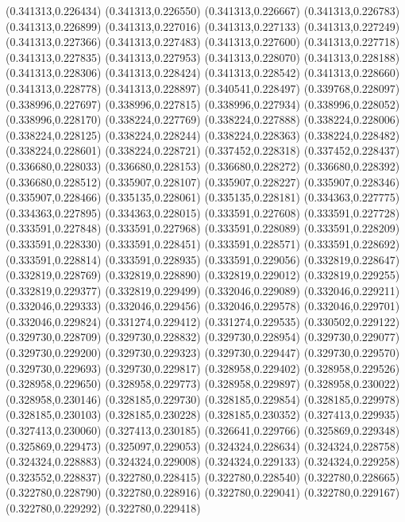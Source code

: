 (0.341313,0.226434)
(0.341313,0.226550)
(0.341313,0.226667)
(0.341313,0.226783)
(0.341313,0.226899)
(0.341313,0.227016)
(0.341313,0.227133)
(0.341313,0.227249)
(0.341313,0.227366)
(0.341313,0.227483)
(0.341313,0.227600)
(0.341313,0.227718)
(0.341313,0.227835)
(0.341313,0.227953)
(0.341313,0.228070)
(0.341313,0.228188)
(0.341313,0.228306)
(0.341313,0.228424)
(0.341313,0.228542)
(0.341313,0.228660)
(0.341313,0.228778)
(0.341313,0.228897)
(0.340541,0.228497)
(0.339768,0.228097)
(0.338996,0.227697)
(0.338996,0.227815)
(0.338996,0.227934)
(0.338996,0.228052)
(0.338996,0.228170)
(0.338224,0.227769)
(0.338224,0.227888)
(0.338224,0.228006)
(0.338224,0.228125)
(0.338224,0.228244)
(0.338224,0.228363)
(0.338224,0.228482)
(0.338224,0.228601)
(0.338224,0.228721)
(0.337452,0.228318)
(0.337452,0.228437)
(0.336680,0.228033)
(0.336680,0.228153)
(0.336680,0.228272)
(0.336680,0.228392)
(0.336680,0.228512)
(0.335907,0.228107)
(0.335907,0.228227)
(0.335907,0.228346)
(0.335907,0.228466)
(0.335135,0.228061)
(0.335135,0.228181)
(0.334363,0.227775)
(0.334363,0.227895)
(0.334363,0.228015)
(0.333591,0.227608)
(0.333591,0.227728)
(0.333591,0.227848)
(0.333591,0.227968)
(0.333591,0.228089)
(0.333591,0.228209)
(0.333591,0.228330)
(0.333591,0.228451)
(0.333591,0.228571)
(0.333591,0.228692)
(0.333591,0.228814)
(0.333591,0.228935)
(0.333591,0.229056)
(0.332819,0.228647)
(0.332819,0.228769)
(0.332819,0.228890)
(0.332819,0.229012)
(0.332819,0.229255)
(0.332819,0.229377)
(0.332819,0.229499)
(0.332046,0.229089)
(0.332046,0.229211)
(0.332046,0.229333)
(0.332046,0.229456)
(0.332046,0.229578)
(0.332046,0.229701)
(0.332046,0.229824)
(0.331274,0.229412)
(0.331274,0.229535)
(0.330502,0.229122)
(0.329730,0.228709)
(0.329730,0.228832)
(0.329730,0.228954)
(0.329730,0.229077)
(0.329730,0.229200)
(0.329730,0.229323)
(0.329730,0.229447)
(0.329730,0.229570)
(0.329730,0.229693)
(0.329730,0.229817)
(0.328958,0.229402)
(0.328958,0.229526)
(0.328958,0.229650)
(0.328958,0.229773)
(0.328958,0.229897)
(0.328958,0.230022)
(0.328958,0.230146)
(0.328185,0.229730)
(0.328185,0.229854)
(0.328185,0.229978)
(0.328185,0.230103)
(0.328185,0.230228)
(0.328185,0.230352)
(0.327413,0.229935)
(0.327413,0.230060)
(0.327413,0.230185)
(0.326641,0.229766)
(0.325869,0.229348)
(0.325869,0.229473)
(0.325097,0.229053)
(0.324324,0.228634)
(0.324324,0.228758)
(0.324324,0.228883)
(0.324324,0.229008)
(0.324324,0.229133)
(0.324324,0.229258)
(0.323552,0.228837)
(0.322780,0.228415)
(0.322780,0.228540)
(0.322780,0.228665)
(0.322780,0.228790)
(0.322780,0.228916)
(0.322780,0.229041)
(0.322780,0.229167)
(0.322780,0.229292)
(0.322780,0.229418)
